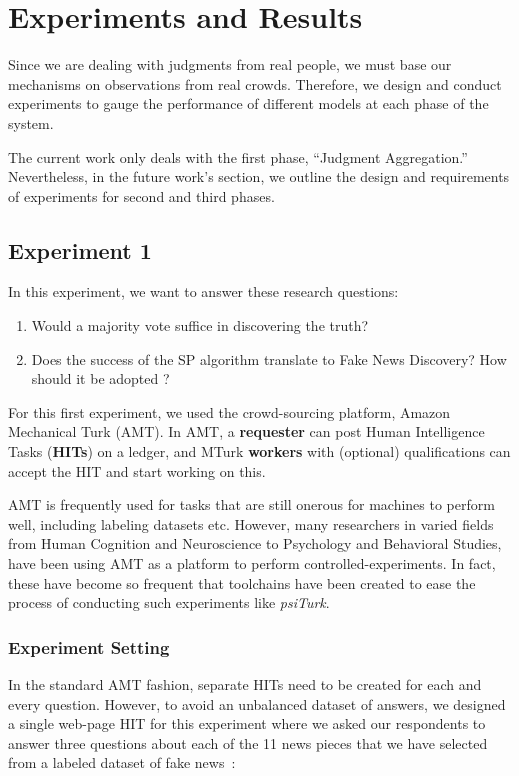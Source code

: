 \documentclass{report}
\theoremstyle{definition}
\begin{document}
\chapter{Experiments and Results}
\label{ch:experiments}
Since we are dealing with judgments from real people, we must base our mechanisms on observations from real crowds. Therefore, we design and conduct experiments to gauge the performance of different models at each phase of the system.

The current work only deals with the first phase, ``Judgment Aggregation.'' Nevertheless, in the future work's section, we outline the design and requirements of  experiments for second and third phases.

\section{Experiment 1}
In this experiment, we want to answer these research questions:

\begin{enumerate}
    \item Would a majority vote suffice in discovering the truth?
    \item Does the success of the SP algorithm translate to Fake News Discovery? How should it be adopted ?
\end{enumerate}

For this first experiment, we used the crowd-sourcing platform, Amazon Mechanical Turk (AMT). In AMT, a \textbf{requester} can post Human Intelligence Tasks (\textbf{HITs}) on a ledger, and MTurk \textbf{workers} with (optional) qualifications can accept the HIT and start working on this.

AMT is frequently used for tasks that are still onerous for machines to perform well, including labeling datasets etc. However, many researchers in varied fields from Human Cognition and Neuroscience to Psychology and Behavioral Studies, have been using AMT as a platform to perform controlled-experiments. In fact, these have become so frequent that toolchains have been created to ease the process of conducting such experiments like \emph{psiTurk}.

\subsection{Experiment Setting}
In the standard AMT fashion, separate HITs need to be created for each and every question. However, to avoid an unbalanced dataset of answers, we designed a single web-page HIT for this experiment where we asked our respondents to answer three questions about each of the 11 news pieces that we have selected from a labeled dataset of fake news~\cite{allcott:stanford}:
\end{document}
